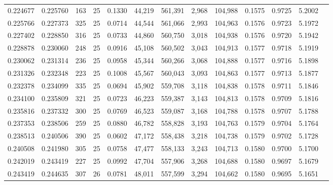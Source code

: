 \begin{tabular}{rrrrrrrrrrrrr}
0.224677 & 0.225760 &   163 &  25 &                                     0.1330 &  44,219 & 561,391 &   2,968 & 104,988 & 0.1575 & 0.9725 & 5.2002 \\
0.225766 & 0.227373 &   325 &  25 &                                     0.0714 &  44,544 & 561,066 &   2,993 & 104,963 & 0.1576 & 0.9723 & 5.1972 \\
0.227402 & 0.228850 &   316 &  25 &                                     0.0733 &  44,860 & 560,750 &   3,018 & 104,938 & 0.1576 & 0.9720 & 5.1942 \\
0.228878 & 0.230060 &   248 &  25 &                                     0.0916 &  45,108 & 560,502 &   3,043 & 104,913 & 0.1577 & 0.9718 & 5.1919 \\
0.230062 & 0.231314 &   236 &  25 &                                     0.0958 &  45,344 & 560,266 &   3,068 & 104,888 & 0.1577 & 0.9716 & 5.1898 \\
0.231326 & 0.232348 &   223 &  25 &                                     0.1008 &  45,567 & 560,043 &   3,093 & 104,863 & 0.1577 & 0.9713 & 5.1877 \\
0.232378 & 0.234099 &   335 &  25 &                                     0.0694 &  45,902 & 559,708 &   3,118 & 104,838 & 0.1578 & 0.9711 & 5.1846 \\
0.234100 & 0.235809 &   321 &  25 &                                     0.0723 &  46,223 & 559,387 &   3,143 & 104,813 & 0.1578 & 0.9709 & 5.1816 \\
0.235816 & 0.237332 &   300 &  25 &                                     0.0769 &  46,523 & 559,087 &   3,168 & 104,788 & 0.1578 & 0.9707 & 5.1788 \\
0.237353 & 0.238506 &   259 &  25 &                                     0.0880 &  46,782 & 558,828 &   3,193 & 104,763 & 0.1579 & 0.9704 & 5.1764 \\
0.238513 & 0.240506 &   390 &  25 &                                     0.0602 &  47,172 & 558,438 &   3,218 & 104,738 & 0.1579 & 0.9702 & 5.1728 \\
0.240508 & 0.241980 &   305 &  25 &                                     0.0758 &  47,477 & 558,133 &   3,243 & 104,713 & 0.1580 & 0.9700 & 5.1700 \\
0.242019 & 0.243419 &   227 &  25 &                                     0.0992 &  47,704 & 557,906 &   3,268 & 104,688 & 0.1580 & 0.9697 & 5.1679 \\
0.243419 & 0.244635 &   307 &  26 &                                     0.0781 &  48,011 & 557,599 &   3,294 & 104,662 & 0.1580 & 0.9695 & 5.1651 \\

\end{tabular}
